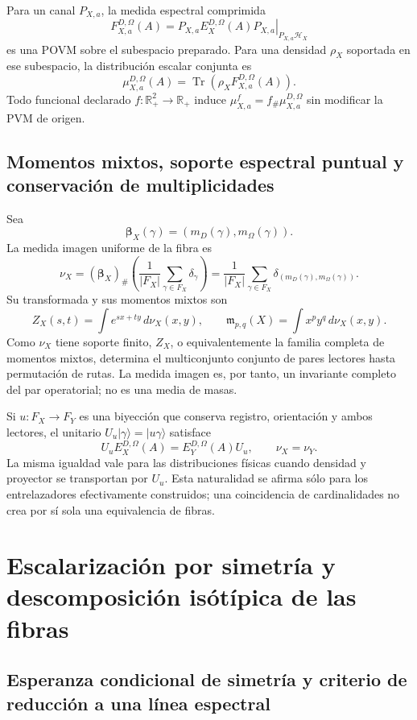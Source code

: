 Para un canal \(P_{X,a}\), la medida espectral comprimida
\[
 F_{X,a}^{D,\Omega}(A)
 =\left.P_{X,a}E_X^{D,\Omega}(A)P_{X,a}\right|_{P_{X,a}\mathcal H_X}
\]
es una POVM sobre el subespacio preparado. Para una densidad \(\rho_X\)
soportada en ese subespacio, la distribución escalar conjunta es
\[
 \mu_{X,a}^{D,\Omega}(A)
 =\operatorname{Tr}\!\left(
 \rho_X F_{X,a}^{D,\Omega}(A)
 \right).
\]
Todo funcional declarado \(f:\mathbb R_+^2\to\mathbb R_+\) induce
\(\mu_{X,a}^f=f_\#\mu_{X,a}^{D,\Omega}\) sin modificar la PVM de origen.

\subsection{Momentos mixtos, soporte espectral puntual y conservación de multiplicidades}

Sea
\[
 \boldsymbol\beta_X(\gamma)
 =(m_D(\gamma),m_\Omega(\gamma)).
\]
La medida imagen uniforme de la fibra es
\[
 \nu_X=(\boldsymbol\beta_X)_\#
 \left(\frac1{|F_X|}\sum_{\gamma\in F_X}\delta_\gamma\right)
 =\frac1{|F_X|}\sum_{\gamma\in F_X}
 \delta_{(m_D(\gamma),m_\Omega(\gamma))}.
\]
Su transformada y sus momentos mixtos son
\[
 Z_X(s,t)=\int e^{sx+ty}\,d\nu_X(x,y),
 \qquad
 \mathfrak m_{p,q}(X)=\int x^py^q\,d\nu_X(x,y).
\]
Como \(\nu_X\) tiene soporte finito, \(Z_X\), o equivalentemente la familia
completa de momentos mixtos, determina el multiconjunto conjunto de pares
lectores hasta permutación de rutas. La medida imagen es, por tanto, un
invariante completo del par operatorial; no es una media de masas.

Si \(u:F_X\to F_Y\) es una biyección que conserva registro, orientación y
ambos lectores, el unitario \(U_u|\gamma\rangle=|u\gamma\rangle\) satisface
\[
 U_uE_X^{D,\Omega}(A)=E_Y^{D,\Omega}(A)U_u,
 \qquad
 \nu_X=\nu_Y.
\]
La misma igualdad vale para las distribuciones físicas cuando densidad y
proyector se transportan por \(U_u\). Esta naturalidad se afirma sólo para
los entrelazadores efectivamente construidos; una coincidencia de
cardinalidades no crea por sí sola una equivalencia de fibras.

\section{Escalarización por simetría y descomposición isótípica de las fibras}

\subsection{Esperanza condicional de simetría y criterio de reducción a una línea espectral}

